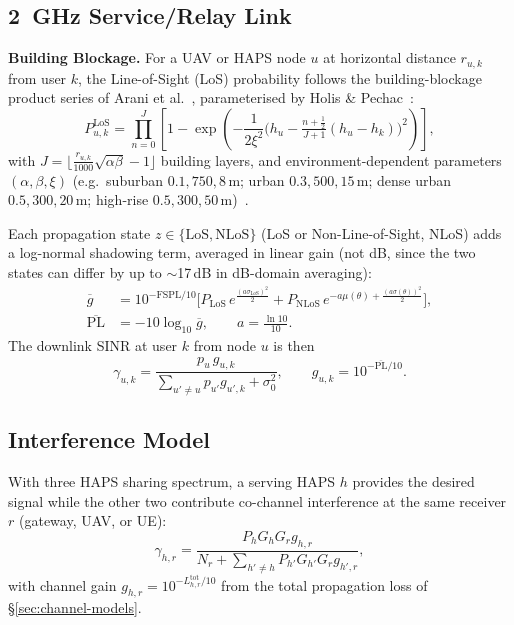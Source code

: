 \documentclass[]{ieeeaccess}
\begin{document}
\subsection{2~GHz Service/Relay Link}
\label{subsec:service-model}

\textbf{Building Blockage.} For a UAV or HAPS node $u$ at horizontal distance $r_{u,k}$ from user $k$, the Line-of-Sight (LoS) probability follows the building-blockage product series of Arani et al.~\cite{arani2023}, parameterised by Holis \& Pechac~\cite{holispechac2008}:
\begin{equation}
P^\mathrm{LoS}_{u,k} = \prod_{n=0}^{J}\left[1-\exp\!\left(-\frac{1}{2\xi^2}\Big(h_u-\tfrac{n+\frac12}{J+1}(h_u-h_k)\Big)^{2}\right)\right],
\label{eq:los}
\end{equation}
with $J=\lfloor \tfrac{r_{u,k}}{1000}\sqrt{\alpha\beta}-1\rfloor$ building layers, and environment-dependent parameters $(\alpha,\beta,\xi)$ (e.g.\ suburban $0.1,750,8$\,m; urban $0.3,500,15$\,m; dense urban $0.5,300,20$\,m; high-rise $0.5,300,50$\,m)~\cite{holispechac2008}.

Each propagation state $z\in\{\mathrm{LoS,NLoS}\}$ (LoS or Non-Line-of-Sight, NLoS) adds a log-normal shadowing term, averaged in linear gain (not dB, since the two states can differ by up to $\sim$17\,dB in dB-domain averaging):
\begin{align}
\overline{g} &= 10^{-\mathrm{FSPL}/10}\Big[P_\mathrm{LoS}\,e^{\tfrac{(a\sigma_\mathrm{LoS})^2}{2}} + P_\mathrm{NLoS}\,e^{-a\mu(\theta)+\tfrac{(a\sigma(\theta))^2}{2}}\Big],\nonumber\\
\overline{\mathrm{PL}} &= -10\log_{10}\overline{g}, \qquad a=\tfrac{\ln 10}{10}.
\label{eq:pl}
\end{align}
The downlink SINR at user $k$ from node $u$ is then
\begin{equation}
\gamma_{u,k} = \frac{p_u\,g_{u,k}}{\sum_{u'\neq u} p_{u'} g_{u',k} + \sigma_0^2}, \qquad g_{u,k}=10^{-\overline{\mathrm{PL}}/10}.
\label{eq:sinr}
\end{equation}

\subsection{Interference Model}
\label{sec:multihaps}

With three HAPS sharing spectrum, a serving HAPS $h$ provides the desired signal while the other two contribute co-channel interference at the same receiver $r$ (gateway, UAV, or UE):
\begin{equation}
\gamma_{h,r}=\frac{P_hG_hG_r g_{h,r}}{N_r + \displaystyle\sum_{h'\neq h}P_{h'}G_{h'}G_r g_{h',r}},
\label{eq:general-haps-sinr}
\end{equation}
with channel gain $g_{h,r}=10^{-L_{h,r}^\mathrm{tot}/10}$ from the total propagation loss of \S\ref{sec:channel-models}.
\end{document}
